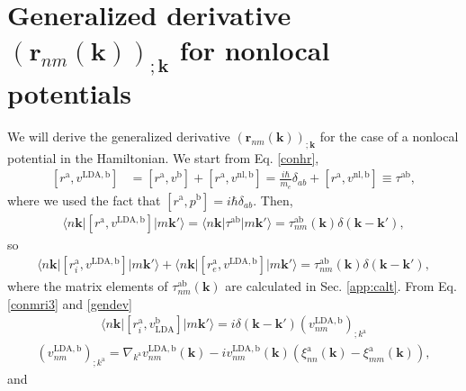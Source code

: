 \section{Generalized derivative
\texorpdfstring{$(\mathbf{r}_{nm}(\mathbf{k}))_{;\mathbf{k}}$} {{rnm};k} for
nonlocal potentials}\label{app:gdernl}

We will derive the generalized derivative
$(\mathbf{r}_{nm}(\mathbf{k}))_{;\mathbf{k}}$ for the case of a nonlocal
potential in the Hamiltonian. We start from Eq. \eqref{conhr},
\begin{align}\label{na_hrdab}
[r^{\mathrm{a}},v^{\mathrm{LDA},\mathrm{b}}]
&= [r^{\mathrm{a}},v^\mathrm{b}] + [r^{\mathrm{a}},v^{\mathrm{nl},\mathrm{b}}]
= \frac{i\hbar}{m_e}\delta_{ab}+ [r^{\mathrm{a}},v^{\mathrm{nl},\mathrm{b}}]
\equiv  
\tau^{\mathrm{a}\mathrm{b}},
\end{align}  
where we used the fact that $[r^\mathrm{a},p^\mathrm{b}]=i\hbar\delta_{ab}$.
Then,
\begin{align}\label{na_hrdab2}
\langle n\mathbf{k}\vert[r^{\mathrm{a}},v^{\mathrm{LDA},\mathrm{b}}]\vert m\mathbf{k}'\rangle
=
\langle n\mathbf{k}\vert\tau^{\mathrm{a}\mathrm{b}}\vert m\mathbf{k}'\rangle
=
\tau^{\mathrm{a}\mathrm{b}}_{nm}(\mathbf{k})\delta(\mathbf{k}-\mathbf{k}')
,
\end{align}
so
\begin{align}\label{na_hrdab3}
\langle n\mathbf{k}\vert[r^{\mathrm{a}}_i,v^{\mathrm{LDA},\mathrm{b}}]\vert m\mathbf{k}'\rangle
+
\langle n\mathbf{k}\vert[r^{\mathrm{a}}_e,v^{\mathrm{LDA},\mathrm{b}}]\vert m\mathbf{k}'\rangle
=
\tau^{\mathrm{a}\mathrm{b}}_{nm}(\mathbf{k})\delta(\mathbf{k}-\mathbf{k}')
,
\end{align}
where the matrix elements of $\tau^{\mathrm{a}\mathrm{b}}_{nm}(\mathbf{k})$ are calculated in  
Sec. \ref{app:calt}.  
From Eq. \eqref{conmri3} and  \eqref{gendev}
\begin{align}\label{na_rip}
\langle n\mathbf{k}\vert[r^{\mathrm{a}}_i,v_\mathrm{LDA}^{\mathrm{b}}]\vert m\mathbf{k}'\rangle
=i\delta(\mathbf{k}-\mathbf{k}')(v_{nm}^{\mathrm{LDA},\mathrm{b}})_{;k^{\mathrm{a}}}
\end{align}
\begin{align}\label{na_ripn}
(v^{\mathrm{LDA},\mathrm{b}}_{nm})_{;k^{\mathrm{a}}}=
\nabla_{k^{\mathrm{a}}}
v^{\mathrm{LDA},\mathrm{b}}_{n m}(\mathbf{k})
-
i
v^{\mathrm{LDA},\mathrm{b}}_{nm}(\mathbf{k})
\left(
\xi^{\mathrm{a}}_{nn}(\mathbf{k})
-
\xi^{\mathrm{a}}_{mm}(\mathbf{k})
\right)
,
\end{align}
and
